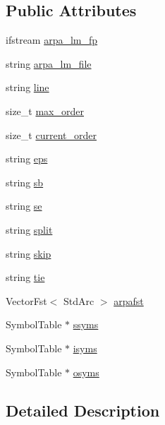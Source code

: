 \subsection*{Public Attributes}
\begin{DoxyCompactItemize}
\item 
ifstream \hyperlink{class_a_r_p_a2_w_f_s_t_a864de8947d779a07aac4fd5fad5eada8}{arpa\+\_\+lm\+\_\+fp}
\item 
string \hyperlink{class_a_r_p_a2_w_f_s_t_adb975c2928af5caf83b23f49286d10a2}{arpa\+\_\+lm\+\_\+file}
\item 
string \hyperlink{class_a_r_p_a2_w_f_s_t_a80673879d80fa9d9f06707e2e4f3c6f5}{line}
\item 
size\+\_\+t \hyperlink{class_a_r_p_a2_w_f_s_t_a0ce9ce2a2c963009a08cf35f73b1c159}{max\+\_\+order}
\item 
size\+\_\+t \hyperlink{class_a_r_p_a2_w_f_s_t_a0aff74ebbb5ca7329772a5f14fec14fe}{current\+\_\+order}
\item 
string \hyperlink{class_a_r_p_a2_w_f_s_t_ac3c171a25b4f9cee7a2977301af868ce}{eps}
\item 
string \hyperlink{class_a_r_p_a2_w_f_s_t_a98d68ef7089bf028a9ec5ce8929a7e9a}{sb}
\item 
string \hyperlink{class_a_r_p_a2_w_f_s_t_aaca67dc9e7b65acfb8aa24b542db8fe4}{se}
\item 
string \hyperlink{class_a_r_p_a2_w_f_s_t_aa9a5047c54dbfe3ffd799a28eb809729}{split}
\item 
string \hyperlink{class_a_r_p_a2_w_f_s_t_a5574ec74f50b2b78490e608ea10ef046}{skip}
\item 
string \hyperlink{class_a_r_p_a2_w_f_s_t_ab2db4a57e9b4020e3c9efda458d1355e}{tie}
\item 
Vector\+Fst$<$ Std\+Arc $>$ \hyperlink{class_a_r_p_a2_w_f_s_t_a2f34de8cb879f22a716881fd867854ed}{arpafst}
\item 
Symbol\+Table $\ast$ \hyperlink{class_a_r_p_a2_w_f_s_t_a3f59b3de10e68a415f44f2f47aaadea8}{ssyms}
\item 
Symbol\+Table $\ast$ \hyperlink{class_a_r_p_a2_w_f_s_t_acfefd0129935a85fc424811a7d3627d3}{isyms}
\item 
Symbol\+Table $\ast$ \hyperlink{class_a_r_p_a2_w_f_s_t_ac115a6b73de97772d853c3ce9470832d}{osyms}
\end{DoxyCompactItemize}


\subsection{Detailed Description}


